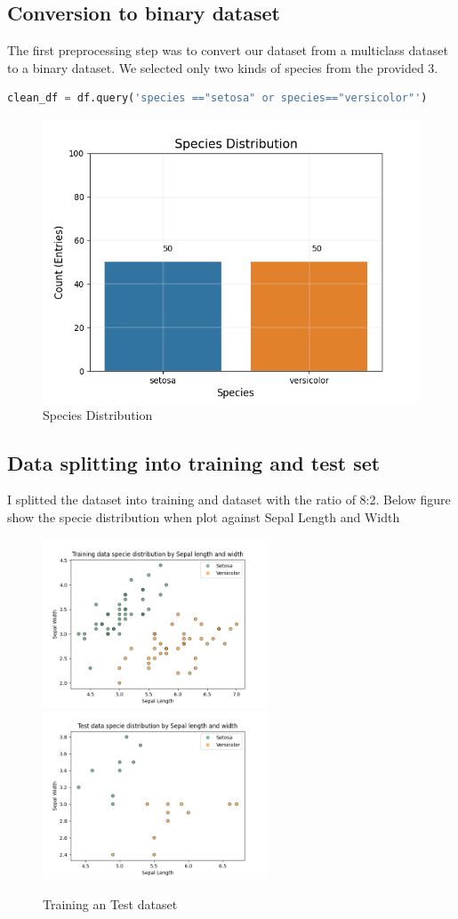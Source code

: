\documentclass[pdftex,10px,a4paper,oneside]{article}
\begin{document}
\subsection{Conversion to binary dataset}
The first preprocessing step was to convert our dataset from a multiclass dataset to a binary dataset. We selected only two kinds of species from the provided 3.
\begin{lstlisting}[language=Python]
clean_df = df.query('species =="setosa" or species=="versicolor"')
\end{lstlisting}
\begin{figure}[h]
\includegraphics[scale=0.5]{classes}
\caption{Species Distribution}
\centering
\end{figure}
\clearpage
\subsection{Data splitting into training and test set}
I splitted the dataset into training and dataset with the ratio of 8:2. Below figure show the specie distribution when plot against Sepal Length and Width

\begin{figure}[h]
\includegraphics[height=5cm]{training}
\includegraphics[height=5cm]{test}
\caption{Training an Test dataset}
\end{figure}
\end{document}
